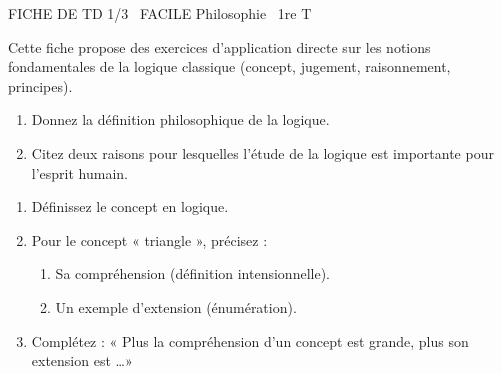 \documentclass[11pt]{article}
\begin{document}
\begin{tcolorbox}[enhanced,colback=popink,colframe=popink,arc=10pt,boxrule=0pt,left=12pt,right=12pt,top=9pt,bottom=9pt]
{\color{white}\popxbold\small FICHE DE TD 1/3 \textbullet\ FACILE \hfill Philosophie \textbullet\ 1re T\par}
\end{tcolorbox}
\vspace{4pt}
Cette fiche propose des exercices d'application directe sur les notions fondamentales de la logique classique (concept, jugement, raisonnement, principes).

\begin{exercice}
\begin{enumerate}
    \item Donnez la définition philosophique de la logique.
    \item Citez deux raisons pour lesquelles l'étude de la logique est importante pour l'esprit humain.
\end{enumerate}
\end{exercice}

\begin{exercice}
\begin{enumerate}
    \item Définissez le concept en logique.
    \item Pour le concept « triangle », précisez :
    \begin{enumerate}
        \item Sa compréhension (définition intensionnelle).
        \item Un exemple d'extension (énumération).
    \end{enumerate}
    \item Complétez : « Plus la compréhension d'un concept est grande, plus son extension est \ldots »
\end{enumerate}
\end{exercice}
\end{document}
